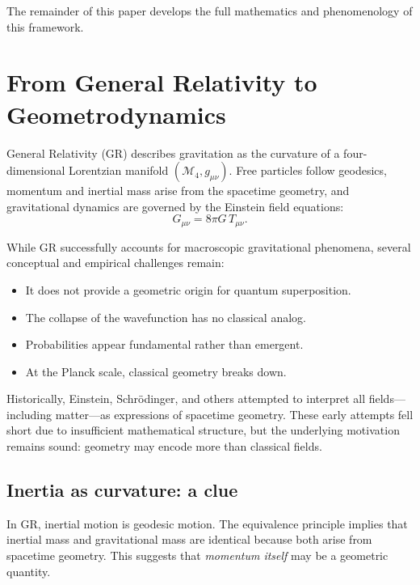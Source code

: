 \documentclass[12pt]{article}
\begin{document}
The remainder of this paper develops the full mathematics and phenomenology of 
this framework.

\newpage


\newpage
\section{From General Relativity to Geometrodynamics}

General Relativity (GR) describes gravitation as the curvature of a 
four-dimensional Lorentzian manifold \((\mathcal{M}_4, g_{\mu\nu})\). Free 
particles follow geodesics, momentum and inertial mass arise from the 
spacetime geometry, and gravitational dynamics are governed by the Einstein 
field equations:
\begin{equation}
G_{\mu\nu} = 8\pi G\, T_{\mu\nu}.
\end{equation}

While GR successfully accounts for macroscopic gravitational phenomena, 
several conceptual and empirical challenges remain:
\begin{itemize}
\item It does not provide a geometric origin for quantum superposition.
\item The collapse of the wavefunction has no classical analog.
\item Probabilities appear fundamental rather than emergent.
\item At the Planck scale, classical geometry breaks down.
\end{itemize}

Historically, Einstein, Schrödinger, and others attempted to interpret all 
fields—including matter—as expressions of spacetime geometry. These early 
attempts fell short due to insufficient mathematical structure, but the 
underlying motivation remains sound: geometry may encode more than classical 
fields.

\subsection{Inertia as curvature: a clue}

In GR, inertial motion is geodesic motion. The equivalence principle implies 
that inertial mass and gravitational mass are identical because both arise 
from spacetime geometry. This suggests that \emph{momentum itself} may be 
a geometric quantity.
\end{document}
